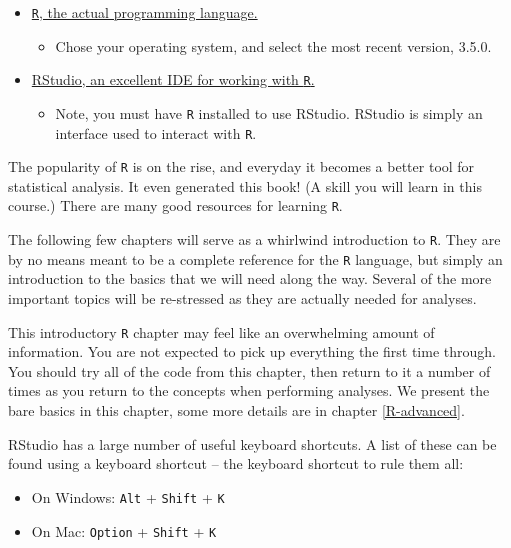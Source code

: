 \documentclass[]{book}
\providecommand{\tightlist}{%
  \setlength{\itemsep}{0pt}\setlength{\parskip}{0pt}}
\theoremstyle{definition}
\theoremstyle{definition}
\theoremstyle{definition}
\theoremstyle{remark}
\begin{document}
\begin{itemize}
\tightlist
\item
  \href{https://www.r-project.org}{\texttt{R}, the actual programming
  language.}

  \begin{itemize}
  \tightlist
  \item
    Chose your operating system, and select the most recent version,
    3.5.0.
  \end{itemize}
\item
  \href{http://www.rstudio.com/}{RStudio, an excellent IDE for working
  with \texttt{R}.}

  \begin{itemize}
  \tightlist
  \item
    Note, you must have \texttt{R} installed to use RStudio. RStudio is
    simply an interface used to interact with \texttt{R}.
  \end{itemize}
\end{itemize}

The popularity of \texttt{R} is on the rise, and everyday it becomes a
better tool for statistical analysis. It even generated this book! (A
skill you will learn in this course.) There are many good resources for
learning \texttt{R}.

The following few chapters will serve as a whirlwind introduction to
\texttt{R}. They are by no means meant to be a complete reference for
the \texttt{R} language, but simply an introduction to the basics that
we will need along the way. Several of the more important topics will be
re-stressed as they are actually needed for analyses.

This introductory \texttt{R} chapter may feel like an overwhelming
amount of information. You are not expected to pick up everything the
first time through. You should try all of the code from this chapter,
then return to it a number of times as you return to the concepts when
performing analyses. We present the bare basics in this chapter, some
more details are in chapter \ref{R-advanced}.

RStudio has a large number of useful keyboard shortcuts. A list of these
can be found using a keyboard shortcut -- the keyboard shortcut to rule
them all:

\begin{itemize}
\tightlist
\item
  On Windows: \texttt{Alt} + \texttt{Shift} + \texttt{K}
\item
  On Mac: \texttt{Option} + \texttt{Shift} + \texttt{K}
\end{itemize}
\end{document}
